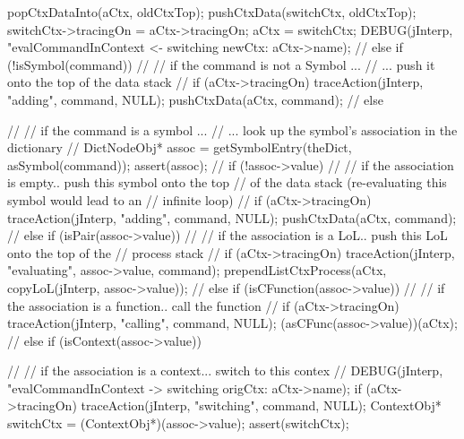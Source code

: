 {{{      popCtxDataInto(aCtx, oldCtxTop);
      pushCtxData(switchCtx, oldCtxTop);
      switchCtx->tracingOn = aCtx->tracingOn;
      aCtx = switchCtx;
      DEBUG(jInterp, "evalCommandInContext <- switching newCtx: %
            aCtx->name);
      //
    } else if (!isSymbol(command)) {
      //
      // if the command is not a Symbol ...
      //  ...  push it onto the top of the data stack
      //
      if (aCtx->tracingOn)
        traceAction(jInterp, "adding", command, NULL);
      pushCtxData(aCtx, command);
      //
    } else {
      //
      // if the command is a symbol ...
      //  ... look up the symbol's association in the dictionary
      //
      DictNodeObj* assoc = getSymbolEntry(theDict, asSymbol(command));
      assert(assoc);
      //
      if (!assoc->value) {
        //
        // if the association is empty.. push this symbol onto the top
        // of the data stack (re-evaluating this symbol would lead to an
        // infinite loop)
        //
        if (aCtx->tracingOn)
          traceAction(jInterp, "adding", command, NULL);
        pushCtxData(aCtx, command);
        //
      } else if (isPair(assoc->value)) {
        //
        // if the association is a LoL.. push this LoL onto the top of the
        // process stack
        //
        if (aCtx->tracingOn)
          traceAction(jInterp, "evaluating", assoc->value, command);
        prependListCtxProcess(aCtx,
          copyLoL(jInterp, assoc->value));
        //
      } else if (isCFunction(assoc->value)) {
        //
        // if the association is a function.. call the function
        //
        if (aCtx->tracingOn)
          traceAction(jInterp, "calling", command, NULL);
        (asCFunc(assoc->value))(aCtx);
        //
      } else if (isContext(assoc->value)) {
        //
        // if the association is a context... switch to this contex
        //
        DEBUG(jInterp, "evalCommandInContext -> switching origCtx: %
              aCtx->name);
        if (aCtx->tracingOn)
          traceAction(jInterp, "switching", command, NULL);
        ContextObj* switchCtx = (ContextObj*)(assoc->value);
        assert(switchCtx);

}}}}
